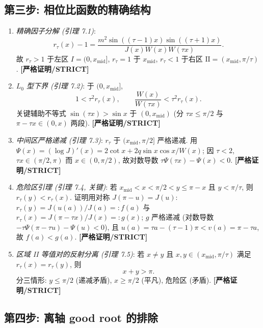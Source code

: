 \documentclass[UTF8]{ctexart}
\newcommand{\STRICT}{\textbf{[严格证明/STRICT]}}
\begin{document}
\subsection{第三步: 相位比函数的精确结构}

\begin{enumerate}
	\item \emph{精确因子分解 (引理 7.1)}:
		\begin{equation}
			r_\tau(x)-1
			=\frac{m^2\sin((\tau-1)x)\sin((\tau+1)x)}{J(x)W(x)W(\tau x)}.
		\end{equation}
		故 $r_\tau>1$ 于左区 $I=(0,x_{\mathrm{mid}}]$, $r_\tau=1$ 于
		$x_{\mathrm{mid}}$, $r_\tau<1$ 于右区 $\mathrm{II}=(x_{\mathrm{mid}},\pi/\tau)$.
		\STRICT{}
	\item \emph{$L_0$ 型下界 (引理 7.2)}: 于 $(0,x_{\mathrm{mid}}]$,
		\begin{equation}
			1<\tau^2r_\tau(x),\qquad
			\frac{W(x)}{W(\tau x)}<\tau^2r_\tau(x).
		\end{equation}
		关键辅助不等式 $\sin(\tau x)>\sin x$ 于 $(0,x_{\mathrm{mid}})$
		(分 $\tau x\le\pi/2$ 与 $\pi-\tau x\in(0,x)$ 两段). \STRICT{}
	\item \emph{中间区严格递减 (引理 7.3)}: $r_\tau$ 于
		$(x_{\mathrm{mid}},\pi/2]$ 严格递减. 用
		$\Psi(x)=(\log J)'(x)=2\cot x+2q\sin x\cos x/W(x)$; 因 $\tau<2$,
		$\tau x\in(\pi/2,\pi)$ 而 $x\in(0,\pi/2)$, 故对数导数
		$\tau\Psi(\tau x)-\Psi(x)<0$. \STRICT{}
	\item \emph{危险区引理 (引理 7.4, 关键)}: 若
		$x_{\mathrm{mid}}<x<\pi/2<y\le\pi-x$ 且 $y<\pi/\tau$, 则
		$r_\tau(y)<r_\tau(x)$. 证明用对称 $J(\pi-u)=J(u)$:
		$r_\tau(y)=J(u(a))/J(a)=:f(a)$ 与 $r_\tau(x)=J(\pi-\tau x)/J(x)=:g(x)$;
		$g$ 严格递减 (对数导数 $-\tau\Psi(\pi-\tau u)-\Psi(u)<0$), 且
		$u(a)=\tau a-(\tau-1)\pi<v(a)=\pi-\tau a$, 故 $f(a)<g(a)$. \STRICT{}
	\item \emph{区域 II 等值对的反射分离 (引理 7.5)}: 若 $x\ne y$ 且
		$x,y\in(x_{\mathrm{mid}},\pi/\tau)$ 满足 $r_\tau(x)=r_\tau(y)$, 则
		\begin{equation}
			x+y>\pi.
		\end{equation}
		分三情形: $y\le\pi/2$ (递减矛盾), $x\ge\pi/2$ (平凡), 危险区 (矛盾).
		\STRICT{}
\end{enumerate}

\subsection{第四步: 离轴 good root 的排除}
\end{document}
